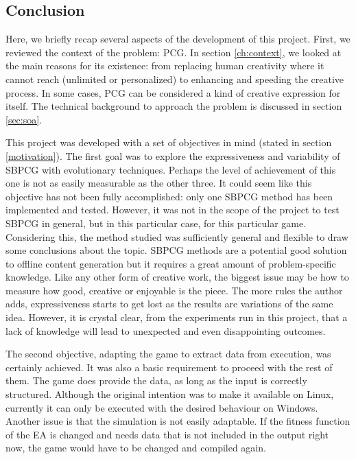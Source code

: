 \subsection{Conclusion}

Here, we briefly recap several aspects of the development of this project. First, we reviewed the context of the problem: PCG. In section \ref{ch:context}, we looked at the main reasons for its existence: from replacing human creativity where it cannot reach (unlimited or personalized) to enhancing and speeding the creative process. In some cases, PCG can  be considered a kind of creative expression for itself. The technical background to approach the problem is discussed in section \ref{sec:soa}.


This project was developed with a set of objectives in mind (stated in section \ref{motivation}). The first goal was to explore the expressiveness and variability of SBPCG with evolutionary techniques. Perhaps the level of achievement of this one is not as easily measurable as the other three. It could seem like this objective has not been fully accomplished: only one SBPCG method has been implemented and tested. However, it was not in the scope of the project to test SBPCG in general, but in this particular case, for this particular game. Considering this, the method studied was sufficiently general and flexible to draw some conclusions about the topic. SBPCG methods are a potential good solution to offline content generation but it requires a great amount of problem-specific knowledge. Like any other form of creative work, the biggest issue may be how to measure how good, creative or enjoyable is the piece. The more rules the author adds, expressiveness starts to get lost as the results are variations of the same idea. However, it is crystal clear, from the experiments run in this project, that a lack of knowledge will lead to unexpected and even disappointing outcomes.

The second objective, adapting the game to extract data from execution, was certainly achieved. It was also a basic requirement to proceed with the rest of them. The game does provide the data, as long as the input is correctly structured. Although the original intention was to make it available on Linux, currently it can only be executed with the desired behaviour on Windows. Another issue is that the simulation is not easily adaptable. If the fitness function of the EA is changed and needs data that is not included in the output right now, the game would have to be changed and compiled again.

